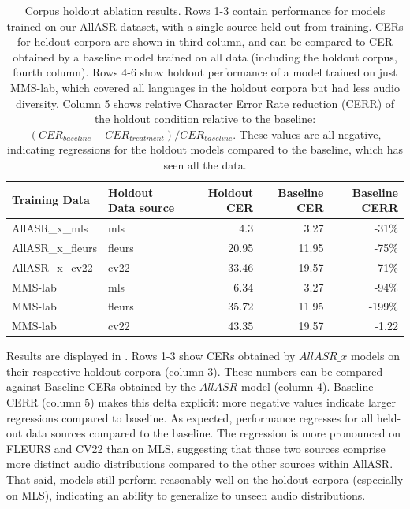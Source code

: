 \begin{table}
    \centering
    \begin{tabular}{llrrr}
    \toprule
         Training Data&  Holdout Data source&  Holdout CER&  Baseline CER& Baseline CERR\\
    \midrule
         AllASR\_x\_mls&  mls&  4.3&  3.27& -31\%\\
         AllASR\_x\_fleurs&  fleurs&  20.95&  11.95& -75\%\\
         AllASR\_x\_cv22&  cv22&  33.46&  19.57& -71\%\\
         MMS-lab&  mls&  6.34&  3.27& -94\%\\
         MMS-lab&  fleurs&  35.72&  11.95& -199\% \\
 MMS-lab& cv22& 43.35& 19.57&-1.22\\
    \bottomrule
    \end{tabular}
    \caption{Corpus holdout ablation results. Rows 1-3 contain performance for models  trained on our AllASR dataset, with a single source held-out from training. CERs for heldout corpora are shown in third column, and can be compared to CER obtained by a baseline model trained on all data (including the holdout corpus, fourth column). Rows 4-6 show holdout performance of a model trained on just MMS-lab, which covered all languages in the holdout corpora but had less audio diversity. Column 5 shows relative Character Error Rate reduction (CERR) of the holdout condition relative to the baseline: $(CER_{baseline} - CER_{treatment})/CER_{baseline}$. These values are all negative, indicating regressions for the holdout models compared to the baseline, which has seen all the data.}
    \label{tab:corpus_holdout_ablation_results}
\end{table}

Results are displayed in . Rows 1-3 show CERs obtained by $AllASR\_x$ models on their respective holdout corpora (column 3). These numbers can be compared against Baseline CERs obtained by the $AllASR$ model (column 4). Baseline CERR (column 5) makes this delta explicit: more negative values indicate larger regressions compared to baseline. As expected, performance regresses for all held-out data sources compared to the baseline.  The regression is more pronounced on FLEURS and CV22 than on MLS, suggesting that those two sources comprise more distinct audio distributions compared to the other sources within AllASR. That said, models still perform reasonably well on the holdout corpora (especially on MLS), indicating an ability to generalize to unseen audio distributions.

